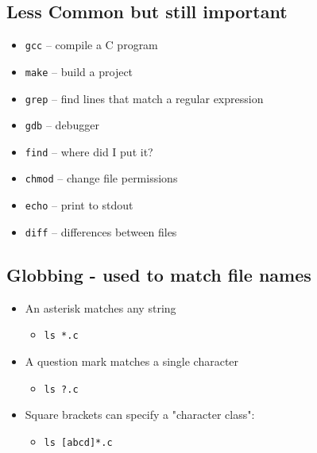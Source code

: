 \documentclass[]{article}
\begin{document}
\subsection{\texorpdfstring{\textbf{Less Common but still
important}}{Less Common but still important}}\label{header-n612}

\begin{itemize}
\item
  \texttt{gcc} -- compile a C program 
\item
  \texttt{make} -- build a project 
\item
  \texttt{grep} -- find lines that match a regular expression 
\item
  \texttt{gdb} -- debugger
\item
  \texttt{find} -- where did I put it?
\item
  \texttt{chmod} -- change file permissions
\item
  \texttt{echo} -- print to stdout
\item
  \texttt{diff} -- differences between files
\end{itemize}

\subsection{\texorpdfstring{\textbf{Globbing - used to match file
names}}{Globbing - used to match file names}}\label{header-n631}

\begin{itemize}
\item
  An asterisk matches any string

  \begin{itemize}
  \item
    \texttt{ls\ *.c}
  \end{itemize}
\item
  A question mark matches a single character

  \begin{itemize}
  \item
    \texttt{ls\ ?.c}
  \end{itemize}
\item
  Square brackets can specify a "character class":

  \begin{itemize}
  \item
    \texttt{ls\ {[}abcd{]}*.c}
  \end{itemize}
\end{itemize}
\end{document}
